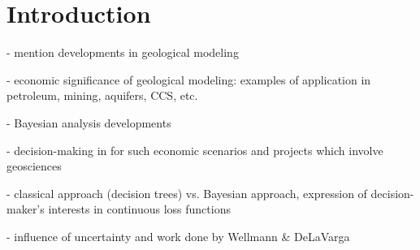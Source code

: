 \chapter{Introduction} \label{chap::intro}

    - mention developments in geological modeling
    
    - economic significance of geological modeling: examples of application in petroleum, mining, aquifers, CCS, etc.
    
    - Bayesian analysis developments
    
    - decision-making in for such economic scenarios and projects which involve geosciences
    
    - classical approach (decision trees) vs. Bayesian approach, expression of decision-maker's interests in continuous loss functions
    
    - influence of uncertainty and work done by Wellmann & DeLaVarga